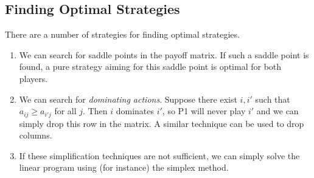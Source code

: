 \subsection{Finding Optimal Strategies}
There are a number of strategies for finding optimal strategies.
\begin{enumerate}
    \item We can search for saddle points in the payoff matrix.
    If such a saddle point is found, a pure strategy aiming for this saddle point is optimal for both players.
    \item We can search for \textit{dominating actions}.
    Suppose there exist \( i, i' \) such that \( a_{ij} \geq a_{i'j} \) for all \( j \).
    Then \( i \) dominates \( i' \), so P1 will never play \( i' \) and we can simply drop this row in the matrix.
    A similar technique can be used to drop columns.
    \item If these simplification techniques are not sufficient, we can simply solve the linear program using (for instance) the simplex method.
\end{enumerate}
